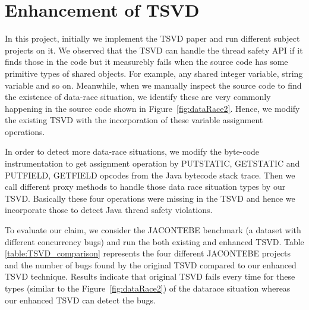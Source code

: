 \section{Enhancement of TSVD}
\label{sec:enhancement_tsvd}

In this project, initially we implement the TSVD paper \cite{li2019efficient} and run different
subject projects on it. We observed that the TSVD can handle the thread safety
API if it finds those in the code but it measurebly fails when the source code has
some primitive types of shared objects. For example, any shared integer
variable, string variable and so on. Meanwhile, when we manually inspect the
source code to find the existence of data-race situation, we identify these are
very commonly happening in the source code shown in Figure~\ref{fig:dataRace2}. Hence, we modify the existing TSVD with the
incorporation of these variable assignment operations.

In order to detect more data-race situations, we modify the byte-code
instrumentation to get assignment operation by PUTSTATIC, GETSTATIC and
PUTFIELD, GETFIELD opcodes from the Java bytecode stack trace. Then we call
different proxy methods to handle those data race situation types by our TSVD. Basically these four operations were missing in the TSVD and hence we incorporate those to detect Java thread safety violations.

To evaluate our claim, we consider the JACONTEBE benchmark (a dataset with
different concurrency bugs) and run the both existing and enhanced TSVD. Table
\ref{table:TSVD_comparison} represents the four different JACONTEBE
projects and the number of bugs found by the original TSVD compared to
our enhanced TSVD technique. Results indicate that
original TSVD fails every time for these types (similar to the Figure~\ref{fig:dataRace2}) of the datarace situation whereas our enhanced TSVD can detect the bugs.

